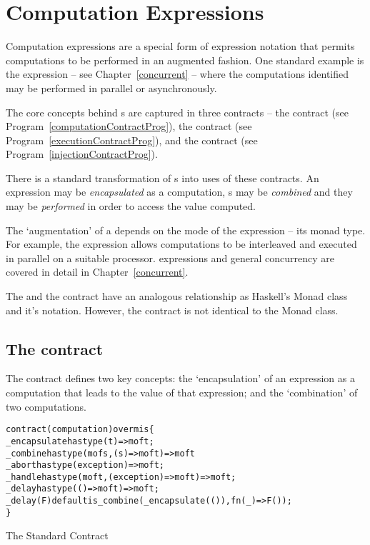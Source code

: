 \chapter{Computation Expressions}
\label{computation}
Computation expressions are a special form of expression notation that permits computations to be performed in an augmented fashion. One standard example is the  expression -- see Chapter~\vref{concurrent} -- where the computations identified may be performed in parallel or asynchronously.

The core concepts behind s are captured in three contracts -- the   contract (see Program~\vref{computationContractProg}), the  contract (see Program~\vref{executionContractProg}), and the  contract (see Program~\vref{injectionContractProg}). 

There is a standard transformation of s into uses of these contracts. An expression may be \emph{encapsulated} as a computation, s may be \emph{combined} and they may be \emph{performed} in order to access the value computed.

The `augmentation' of a  depends on the mode of the expression -- its monad type. For example, the  expression allows computations to be interleaved and executed in parallel on a suitable processor.  expressions and general concurrency are covered in detail in Chapter~\vref{concurrent}.

\begin{aside}
The  and the  contract have an analogous relationship as Haskell's Monad class and it's  notation. However, the  contract is not identical to the Monad class.
\end{aside}

\section{The  contract}
\label{computationContract}
The  contract defines two key concepts: the `encapsulation' of an expression as a computation that leads to the value of that expression; and the `combination' of two computations.


\begin{program}
\begin{alltt}
contract (computation) over m is \{
  _encapsulate has type (t)=>m of t;
  _combine has type (m of s,(s)=>m of t)=>m of t
  _abort has type (exception)=>m of t;
  _handle has type (m of t, (exception)=>m of t) => m of t;
  _delay has type (()=>m of t)=>m of t;
  _delay(F) default is _combine(_encapsulate(()),fn(_) => F());
\}
\end{alltt}
\caption{The Standard  Contract\label{computationContractProg}}
\end{program}

